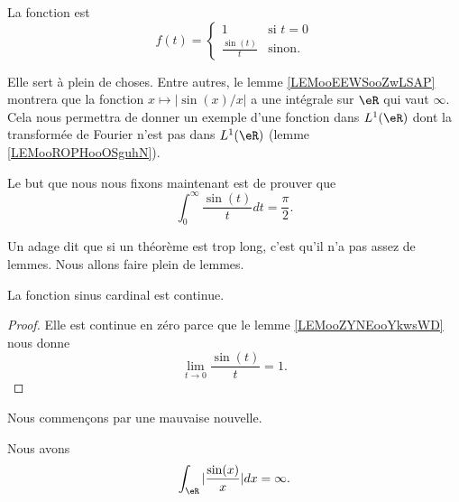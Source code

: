 \begin{definition}
	La fonction  est
	\begin{equation}
		f(t)=\begin{cases}
			1                     & \text{si } t=0 \\
			\frac{ \sin(t) }{ t } & \text{sinon. }
		\end{cases}
	\end{equation}
\end{definition}
Elle sert à plein de choses. Entre autres, le lemme \ref{LEMooEEWSooZwLSAP} montrera que la fonction \( x\mapsto | \sin(x)/x |\) a une intégrale sur \( \eR\) qui vaut \( \infty\). Cela nous permettra de donner un exemple d'une fonction dans \( L^1(\eR)\) dont la transformée de Fourier n'est pas dans \( L^1(\eR)\) (lemme \ref{LEMooROPHooOSguhN}).

\begin{normaltext}
	Le but que nous nous fixons maintenant est de prouver que
	\begin{equation}
		\int_{0}^{\infty}\frac{ \sin(t) }{ t }dt=\frac{ \pi }{2}.
	\end{equation}

	Un adage dit que si un théorème est trop long, c'est qu'il n'a pas assez de lemmes. Nous allons faire plein de lemmes.
\end{normaltext}

\begin{lemma}       \label{LEMooMJFBooAjtNjV}
	La fonction sinus cardinal est continue.
\end{lemma}

\begin{proof}
	Elle est continue en zéro parce que le lemme \ref{LEMooZYNEooYkwsWD} nous donne
	\begin{equation}
		\lim_{t\to 0}\frac{ \sin(t) }{ t }=1.
	\end{equation}
\end{proof}

Nous commençons par une mauvaise nouvelle.
\begin{lemma}           \label{LEMooEEWSooZwLSAP}
	Nous avons
	\begin{equation}
		\int_{\eR}| \frac{ \sin(x) }{ x } |dx=\infty.
	\end{equation}
\end{lemma}

